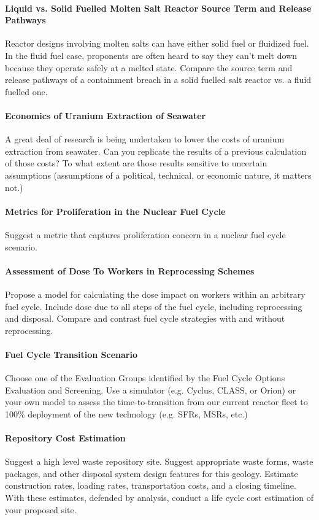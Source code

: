 \documentclass[12pts, answers]{exam}
\begin{document}
\paragraph{Liquid vs. Solid Fuelled Molten Salt Reactor Source Term and Release
Pathways} Reactor designs involving molten salts can have either solid fuel or
fluidized fuel. In the fluid fuel case, proponents are often heard to say they
can't melt down because they operate safely at a melted state. Compare the
source term and release pathways of a containment breach in a solid fuelled
salt reactor vs. a fluid fuelled one.

\paragraph{Economics of Uranium Extraction of Seawater} A great deal of
research is being undertaken to lower the costs of uranium extraction from
seawater. Can you replicate the results of a previous calculation of those
costs? To what extent are those results sensitive to uncertain assumptions
(assumptions of a political, technical, or economic nature, it matters not.)

\paragraph{Metrics for Proliferation in the Nuclear Fuel Cycle} Suggest a
metric that captures proliferation concern in a nuclear fuel cycle scenario.

\paragraph{Assessment of Dose To Workers in Reprocessing Schemes} Propose a model for
calculating the dose impact on workers within an arbitrary fuel cycle. Include
dose due to all steps of the fuel cycle, including reprocessing and disposal.
Compare and contrast fuel cycle strategies with and without reprocessing.

\paragraph{Fuel Cycle Transition Scenario} Choose one of the Evaluation Groups
identified by the Fuel Cycle Options Evaluation and Screening. Use a simulator
(e.g. Cyclus, CLASS, or Orion) or your own model to assess the
time-to-transition from our current reactor fleet to 100\% deployment of the
new technology (e.g. SFRs, MSRs, etc.)

\paragraph{Repository Cost Estimation} Suggest a high level waste repository
site. Suggest appropriate waste forms, waste packages, and other disposal
system design features for this geology. Estimate construction rates, loading
rates, transportation costs, and a closing timeline. With these estimates,
defended by analysis, conduct a life cycle cost estimation of your proposed
site.


%
%
\end{document}
